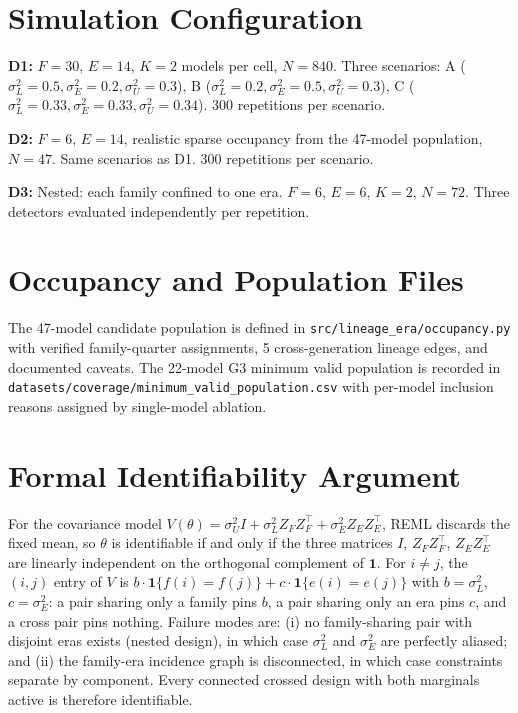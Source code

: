 \documentclass[journal]{IEEEtran}
\begin{document}
\section{Simulation Configuration}
\label{app:sim_config}

\textbf{D1:} $F = 30$, $E = 14$, $K = 2$ models per cell, $N = 840$. Three scenarios: A ($\sigma^2_L = 0.5, \sigma^2_E = 0.2, \sigma^2_U = 0.3$), B ($\sigma^2_L = 0.2, \sigma^2_E = 0.5, \sigma^2_U = 0.3$), C ($\sigma^2_L = 0.33, \sigma^2_E = 0.33, \sigma^2_U = 0.34$). 300 repetitions per scenario.

\textbf{D2:} $F = 6$, $E = 14$, realistic sparse occupancy from the 47-model population, $N = 47$. Same scenarios as D1. 300 repetitions per scenario.

\textbf{D3:} Nested: each family confined to one era. $F = 6$, $E = 6$, $K = 2$, $N = 72$. Three detectors evaluated independently per repetition.

\section{Occupancy and Population Files}
\label{app:occupancy}

The 47-model candidate population is defined in \texttt{src/lineage\_era/occupancy.py} with verified family-quarter assignments, 5 cross-generation lineage edges, and documented caveats. The 22-model G3 minimum valid population is recorded in \texttt{datasets/coverage/minimum\_valid\_population.csv} with per-model inclusion reasons assigned by single-model ablation.

\section{Formal Identifiability Argument}
\label{app:formal}

For the covariance model $V(\theta) = \sigma^2_U I + \sigma^2_L Z_F Z_F^\top + \sigma^2_E Z_E Z_E^\top$, REML discards the fixed mean, so $\theta$ is identifiable if and only if the three matrices $I$, $Z_F Z_F^\top$, $Z_E Z_E^\top$ are linearly independent on the orthogonal complement of $\mathbf{1}$. For $i \neq j$, the $(i,j)$ entry of $V$ is $b \cdot \mathbf{1}\{f(i) = f(j)\} + c \cdot \mathbf{1}\{e(i) = e(j)\}$ with $b = \sigma^2_L$, $c = \sigma^2_E$: a pair sharing only a family pins $b$, a pair sharing only an era pins $c$, and a cross pair pins nothing. Failure modes are: (i) no family-sharing pair with disjoint eras exists (nested design), in which case $\sigma^2_L$ and $\sigma^2_E$ are perfectly aliased; and (ii) the family-era incidence graph is disconnected, in which case constraints separate by component. Every connected crossed design with both marginals active is therefore identifiable.
\end{document}
